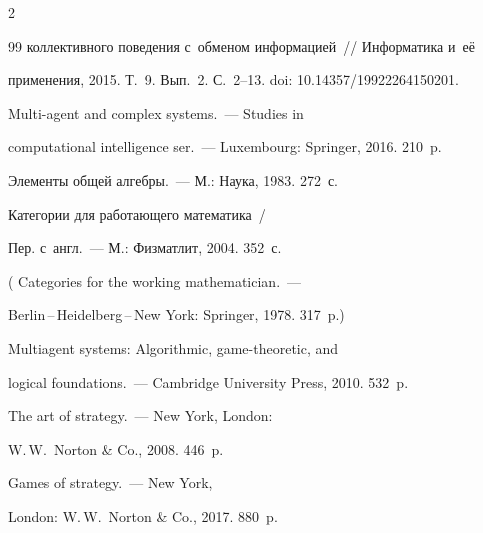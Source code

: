 \begin{multicols}{2}
{{\begin{thebibliography}{99}
коллективного поведения с~обменом информацией~// Информатика и~её 

применения, 2015. Т.~9. Вып.~2. С.~2--13. doi: 10.14357/19922264150201.


 Multi-agent and complex systems.~--- Studies in 

computational intelligence ser.~--- Luxembourg: Springer, 2016. 210~p.


 Элементы общей ал\-геб\-ры.~--- М.: Наука, 1983. 272~с.


 Категории для ра\-бо\-та\-юще\-го математика~/

Пер. с~англ.~--- М.: Физматлит, 2004.  352~с.

( Categories for the working mathematician.~---  

Berlin\,--\,Heidelberg\,--\,New York: Springer, 1978. 317~p.)


 Multiagent systems: Algorithmic, game-theoretic, and 

logical foundations.~--- Cambridge University Press, 2010. 532~p.




 The art of strategy.~--- New York, London: 

W.\,W.~Norton \& Co., 2008. 446~p.




 Games of strategy.~--- New York, 

London: W.\,W.~Norton \& Co., 2017. 880~p.



\end{thebibliography}



 }

 }



\end{multicols}



\vspace*{-8pt}



